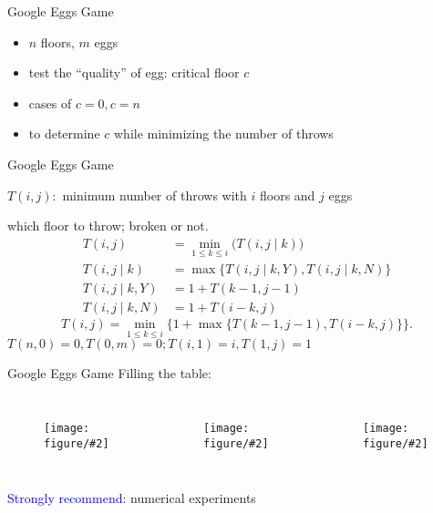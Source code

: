 \documentclass{beamer}
\newcommand{\fig}[2]
{
  \begin{figure}[htp]
	  \centering
	  \texttt{[image: figure/\#2]}
  \end{figure}
}
\begin{document}
\begin{frame}{Google Eggs Game}
  \begin{problem}
    \begin{itemize}
      \item $n$ floors, $m$ eggs
      \item test the ``quality'' of egg: critical floor $c$
      \item cases of $c=0, c=n$
      \item {} to determine $c$ while minimizing the number of throws 
    \end{itemize}
  \end{problem}
\end{frame}
\begin{frame}{Google Eggs Game}
  \begin{mdframed}
    $T(i,j):$ minimum number of throws with $i$ floors and $j$ eggs
  \end{mdframed}
  
  \vspace{0.30cm}
  \begin{theorem}[Recurrence]
     which floor to throw; broken or not.
    \begin{align*}
      T(i,j) &= \min_{1 \le k \le i} \big( T(i,j \mid k) \big)  \\
      T(i,j \mid k) &= \max \{ T(i,j \mid k,Y), T(i,j \mid k,N) \} \\
      T(i,j \mid k,Y) &= 1 + T(k-1, j-1)  \\
      T(i,j \mid k,N) &= 1 + T(i-k, j)
    \end{align*}
    \[
	  T(i,j) = \min_{1 \le k \le i} \{ 1 + \max \{ T(k-1,j-1), T(i-k,j) \} \}.      
    \]
    \vspace{0.30cm}
     $T(n,0) = 0, T(0,m) = 0; T(i,1) = i, T(1,j) = 1$
  \end{theorem}
\end{frame}
\begin{frame}{Google Eggs Game}
  Filling the table:
  \begin{columns}
      \fig{width = 0.90\textwidth}{googleeggorder}
      \fig{width = 0.75\textwidth}{row-major}
      \fig{width = 0.75\textwidth}{col-major}
  \end{columns}

  \vspace{1.00cm}
  \begin{mdframed}
    \textcolor{blue}{Strongly recommend}: numerical experiments
  \end{mdframed}
\end{frame}
\end{document}
